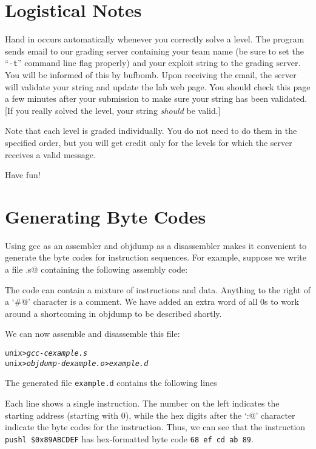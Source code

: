 \documentclass[11pt]{article}
\newenvironment{ccode}%
{\small}%
{}
\newenvironment{tty}%
{\small\begin{alltt}}%
{\end{alltt}}
\begin{document}
\section*{Logistical Notes}

Hand in occurs automatically whenever you correctly solve a level.
The program sends email to our grading server containing your team
name (be sure to set the ``{\tt -t}'' command line flag properly) and
your exploit string to the grading server.  You will be informed of
this by {\sc bufbomb}.  Upon receiving the email, the server will
validate your string and update the lab web page.  You should check
this page a few minutes after your submission to make sure your string
has been validated.  [If you really solved the level, your string {\em
should} be valid.]

Note that each level is graded individually.  You do not need to do
them in the specified order, but you will get credit only for the
levels for which the server receives a valid message.

Have fun!

\section*{Generating Byte Codes}

Using {\sc gcc} as an assembler and {\sc objdump} as a disassembler
makes it convenient to generate the byte codes for instruction sequences.
For example, suppose we write a file \verb@example.s@ containing the
following assembly code:
\begin{tty}

\end{tty}
The code can contain a mixture of instructions and data.
Anything to the right of a `\verb@#@' character is a comment.  
We have
added an extra word of all 0s to work around a shortcoming in {\sc
objdump} to be described shortly.

We can now assemble and disassemble this file:
\begin{tty}
unix>{\em gcc -c example.s}
unix>{\em objdump -d example.o > example.d}
\end{tty}
The generated file {\tt example.d} contains the following lines
\begin{ccode}

\end{ccode}
Each line shows a single instruction.  The number on the left
indicates the starting address (starting with 0), while the hex digits
after the `\verb@:@' character indicate the byte codes for the
instruction.  Thus, we can see that the instruction {\tt pushl
\$0x89ABCDEF} has hex-formatted byte code {\tt 68 ef cd ab 89}.
\end{document}
